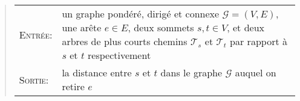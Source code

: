 \documentclass{article}
\renewcommand{\G}{\mathcal{G}}                   %
\newcommand{\T}{\mathcal{T}}                     %
\begin{document}
\begin{question}
\begin{enumerate}[(a)]
\begin{enumerate}[(i)]
      \begin{quote}
        \vspace*{5pt}
        \begin{tabular}{lp{10cm}}
          \textsc{Entrée}: & un graphe pondéré, dirigé et connexe $\G =
          (V, E)$, une arête $e \in E$, deux sommets $s, t \in V$, et
          deux arbres de plus courts chemins $\T_s$ et $\T_t$ par
          rapport à $s$ et $t$ respectivement \\[5pt]
          
          \textsc{Sortie}: & la distance entre $s$ et $t$ dans le graphe
          $\G$ auquel on retire $e$
        \end{tabular}
        \vspace*{5pt}
      \end{quote}
    \end{enumerate}    
  \end{enumerate}
\end{question}
\end{document}
